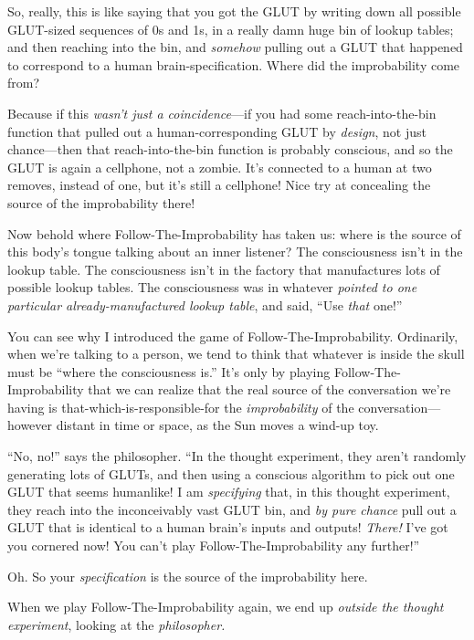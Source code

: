 {
 So, really, this is like saying that you got the GLUT by writing
down all possible GLUT-sized sequences of 0s and 1s, in a really damn
huge bin of lookup tables; and then reaching into the bin, and
\textit{somehow} pulling out a GLUT that happened to correspond to a
human brain-specification. Where did the improbability come from?}

{
 Because if this \textit{wasn't just a
coincidence}{}---if you had some reach-into-the-bin function that
pulled out a human-corresponding GLUT by \textit{design}, not just
chance---then that reach-into-the-bin function is probably conscious,
and so the GLUT is again a cellphone, not a zombie.
It's connected to a human at two removes, instead of
one, but it's still a cellphone! Nice try at concealing
the source of the improbability there!}

{
 Now behold where Follow-The-Improbability has taken us: where is
the source of this body's tongue talking about an inner
listener? The consciousness isn't in the lookup table.
The consciousness isn't in the factory that
manufactures lots of possible lookup tables. The consciousness was in
whatever \textit{pointed to one particular already-manufactured lookup
table}, and said, ``Use \textit{that}
one!''}

{
 You can see why I introduced the game of Follow-The-Improbability.
Ordinarily, when we're talking to a person, we tend to
think that whatever is inside the skull must be
``where the consciousness is.''
It's only by playing Follow-The-Improbability that we
can realize that the real source of the conversation
we're having is that-which-is-responsible-for the
\textit{improbability} of the conversation---however distant in time or
space, as the Sun moves a wind-up toy.}

{
 ``No, no!'' says the
philosopher. ``In the thought experiment, they
aren't randomly generating lots of GLUTs, and then
using a conscious algorithm to pick out one GLUT that seems humanlike!
I am \textit{specifying} that, in this thought experiment, they reach
into the inconceivably vast GLUT bin, and \textit{by pure chance} pull
out a GLUT that is identical to a human brain's inputs
and outputs! \textit{There!} I've got you cornered now!
You can't play Follow-The-Improbability any
further!''}

{
 Oh. So your \textit{specification} is the source of the
improbability here.}

{
 When we play Follow-The-Improbability again, we end up
\textit{outside the thought experiment}, looking at the
\textit{philosopher.}}

